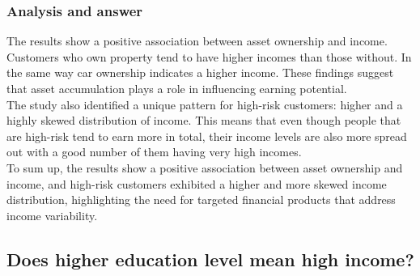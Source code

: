 \documentclass{article}\usepackage[]{graphicx}\usepackage[]{xcolor}
\begin{document}
\subsubsection{Analysis and answer}

The results show a positive association between asset ownership and income. Customers who own property tend to have higher incomes than those without. In the same way car ownership indicates a higher income. These findings suggest that asset accumulation plays a role in influencing earning potential.\\

The study also identified a unique pattern for high-risk customers: higher and a highly skewed distribution of income. This means that even though people that are high-risk tend to earn more in total, their income levels are also more spread out with a good number of them having very high incomes.\\

To sum up, the results show a positive association between asset ownership and income, and high-risk customers exhibited a higher and more skewed income distribution, highlighting the need for targeted financial products that address income variability.



\subsection{Does higher education level mean high income?}
\end{document}
